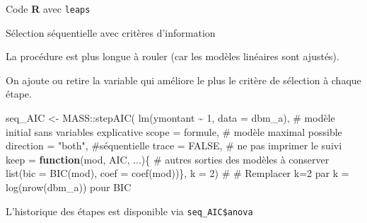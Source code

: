 \documentclass[
  ignorenonframetext,
]{beamer}
\newenvironment{Shaded}{\begin{snugshade}}{\end{snugshade}}
\newcommand{\AttributeTok}[1]{\textcolor[rgb]{0.40,0.45,0.13}{#1}}
\newcommand{\CommentTok}[1]{\textcolor[rgb]{0.37,0.37,0.37}{#1}}
\newcommand{\ConstantTok}[1]{\textcolor[rgb]{0.56,0.35,0.01}{#1}}
\newcommand{\ControlFlowTok}[1]{\textcolor[rgb]{0.00,0.23,0.31}{\textbf{#1}}}
\newcommand{\DecValTok}[1]{\textcolor[rgb]{0.68,0.00,0.00}{#1}}
\newcommand{\FunctionTok}[1]{\textcolor[rgb]{0.28,0.35,0.67}{#1}}
\newcommand{\NormalTok}[1]{\textcolor[rgb]{0.00,0.23,0.31}{#1}}
\newcommand{\OtherTok}[1]{\textcolor[rgb]{0.00,0.23,0.31}{#1}}
\newcommand{\SpecialCharTok}[1]{\textcolor[rgb]{0.37,0.37,0.37}{#1}}
\newcommand{\StringTok}[1]{\textcolor[rgb]{0.13,0.47,0.30}{#1}}
\begin{document}
\begin{frame}[fragile]{Code \textbf{R} avec \texttt{leaps}}
\protect{}\label{code-r-avec-leaps}
\begin{Shaded}
\end{Shaded}
\end{frame}

\begin{frame}[fragile]{Sélection séquentielle avec critères
d'information}
\protect{}\label{suxe9lection-suxe9quentielle-avec-crituxe8res-dinformation}
\footnotesize

La procédure est plus longue à rouler (car les modèles linéaires sont
ajustés).

On ajoute ou retire la variable qui améliore le plus le critère de
sélection à chaque étape.

\begin{Shaded}
\begin{Highlighting}[numbers=left,,]
\NormalTok{seq\_AIC }\OtherTok{\textless{}{-}}\NormalTok{ MASS}\SpecialCharTok{::}\FunctionTok{stepAIC}\NormalTok{(}
  \FunctionTok{lm}\NormalTok{(ymontant }\SpecialCharTok{\textasciitilde{}} \DecValTok{1}\NormalTok{, }\AttributeTok{data =}\NormalTok{ dbm\_a), }
  \CommentTok{\# modèle initial sans variables explicative}
    \AttributeTok{scope =}\NormalTok{ formule, }\CommentTok{\# modèle maximal possible}
    \AttributeTok{direction =} \StringTok{"both"}\NormalTok{, }\CommentTok{\#séquentielle}
    \AttributeTok{trace =} \ConstantTok{FALSE}\NormalTok{, }\CommentTok{\# ne pas imprimer le suivi}
    \AttributeTok{keep =} \ControlFlowTok{function}\NormalTok{(mod, AIC, ...)\{ }
      \CommentTok{\# autres sorties des modèles à conserver}
      \FunctionTok{list}\NormalTok{(}\AttributeTok{bic =} \FunctionTok{BIC}\NormalTok{(mod), }
           \AttributeTok{coef =} \FunctionTok{coef}\NormalTok{(mod))\},}
    \AttributeTok{k =} \DecValTok{2}\NormalTok{) }\CommentTok{\#}
\CommentTok{\# Remplacer k=2 par k = log(nrow(dbm\_a)) pour BIC}
\end{Highlighting}
\end{Shaded}

L'historique des étapes est disponible via \texttt{seq\_AIC\$anova}

\normalsize
\end{frame}
\end{document}
